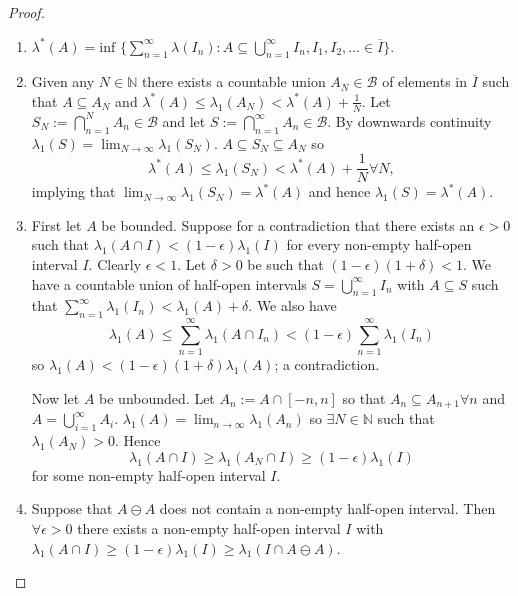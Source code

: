 \documentclass{article}
\begin{document}
\begin{proof}
\begin{enumerate}
    \item $\lambda^*(A)=\text{inf }\{\sum_{n=1}^\infty\lambda(I_n):A\subseteq\bigcup_{n=1}^\infty I_n,I_1,I_2,...\in\overline{I}\}$.
    \item Given any $N\in\mathbb{N}$ there exists a countable union $A_N\in\mathcal{B}$ of elements in $\overline{I}$ such that $A\subseteq A_N$ and $\lambda^*(A)\leq\lambda_1(A_N)<\lambda^*(A)+\frac{1}{N}$. Let $S_N:=\bigcap_{n=1}^N A_n\in\mathcal{B}$ and let $S:=\bigcap_{n=1}^\infty A_n\in\mathcal{B}$. By downwards continuity $\lambda_1(S)=\lim_{N\to\infty}\lambda_1(S_N)$. $A\subseteq S_N\subseteq A_N$ so \[\lambda^*(A)\leq\lambda_1(S_N)<\lambda^*(A)+\frac{1}{N}\forall N,\] implying that $\lim_{N\to\infty}\lambda_1(S_N)=\lambda^*(A)$ and hence $\lambda_1(S)=\lambda^*(A)$.
    \item First let $A$ be bounded. Suppose for a contradiction that there exists an $\epsilon>0$ such that  $\lambda_1(A\cap I)<(1-\epsilon)\lambda_1(I)$ for every non-empty half-open interval $I$. Clearly $\epsilon<1$. Let $\delta>0$ be such that $(1-\epsilon)(1+\delta)<1$. We have a countable union of half-open intervals $S=\bigcup_{n=1}^\infty I_n$ with $A\subseteq S$ such that $\sum_{n=1}^\infty\lambda_1(I_n)<\lambda_1(A)+\delta$. We also have \[\lambda_1(A)\leq\sum_{n=1}^\infty\lambda_1(A\cap I_n)<(1-\epsilon)\sum_{n=1}^\infty\lambda_1(I_n)\] so $\lambda_1(A)<(1-\epsilon)(1+\delta)\lambda_1(A)$; a contradiction.

    Now let $A$ be unbounded. Let $A_n:=A\cap[-n,n]$ so that $A_n\subseteq A_{n+1}\forall n$ and $A=\bigcup_{i=1}^\infty A_i$. $\lambda_1(A)=\lim_{n\to\infty}\lambda_1(A_n)$ so $\exists N\in\mathbb{N}$ such that $\lambda_1(A_N)>0$. Hence \[\lambda_1(A\cap I)\geq\lambda_1(A_N\cap I)\geq(1-\epsilon)\lambda_1(I)\] for some non-empty half-open interval $I$.
    \item Suppose that $A\ominus A$ does not contain a non-empty half-open interval. Then $\forall\epsilon>0$ there exists a non-empty half-open interval $I$ with $\lambda_1(A\cap I)\geq(1-\epsilon)\lambda_1(I)\geq\lambda_1(I\cap A\ominus A)$.


\end{enumerate}
\end{proof}
\end{document}
